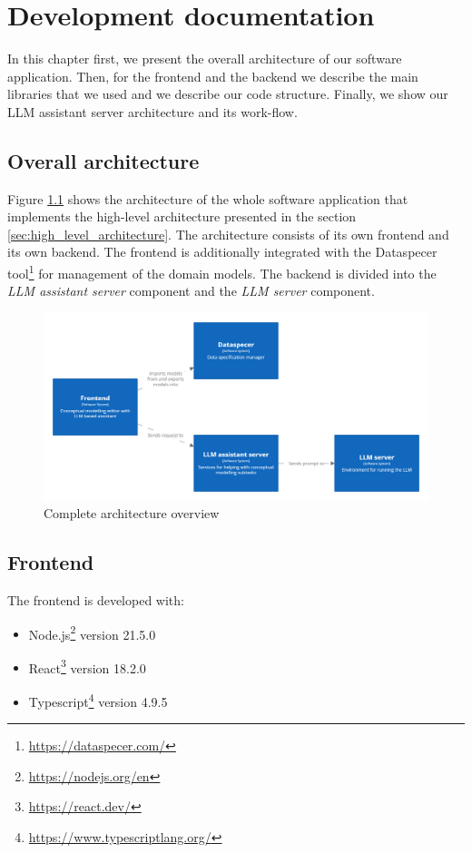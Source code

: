 \chapter{Development documentation}
\label{chap:development_documentation}

In this chapter first, we present the overall architecture of our software application. Then, for the frontend and the backend we describe the main libraries that we used and we describe our code structure. Finally, we show our LLM assistant server architecture and its work-flow.


\section{Overall architecture}

Figure \ref{fig:complete_overview} shows the architecture of the whole software application that implements the high-level architecture presented in the section \ref{sec:high_level_architecture}. The architecture consists of its own frontend and its own backend. The frontend is additionally integrated with the Dataspecer tool\footnote{\url{https://dataspecer.com/}} for management of the domain models. The backend is divided into the \emph{LLM assistant server} component and the \emph{LLM server} component.

\begin{figure}[!h]
    \includegraphics[scale=0.20]{../docs/images/architecture/complete-overview.png}
    \caption{\centering Complete architecture overview}
    \label{fig:complete_overview}
\end{figure}


\section{Frontend}

\noindent{}The frontend is developed with:
\begin{itemize}
\item Node.js\footnote{\url{https://nodejs.org/en}} version 21.5.0
\item React\footnote{\url{https://react.dev/}} version 18.2.0
\item Typescript\footnote{\url{https://www.typescriptlang.org/}} version 4.9.5
\end{itemize}


